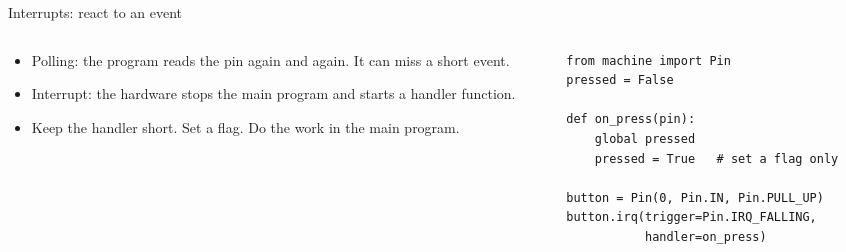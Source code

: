 \begin{frame}[fragile]{Interrupts: react to an event}
  \begingroup\centering
  \par\endgroup
  \begin{columns}[T]
    \begin{column}{0.47\textwidth}
      \small
      \begin{itemize}
        \item Polling: the program reads the pin again and again. It can
              miss a short event.
        \item Interrupt: the hardware stops the main program and starts
              a handler function.
        \item Keep the handler short. Set a flag. Do the work in the main
              program.
      \end{itemize}
    \end{column}
    \begin{column}{0.50\textwidth}
\begin{lstlisting}[style=python]
from machine import Pin
pressed = False

def on_press(pin):
    global pressed
    pressed = True   # set a flag only

button = Pin(0, Pin.IN, Pin.PULL_UP)
button.irq(trigger=Pin.IRQ_FALLING,
           handler=on_press)
\end{lstlisting}
    \end{column}
  \end{columns}
\end{frame}

